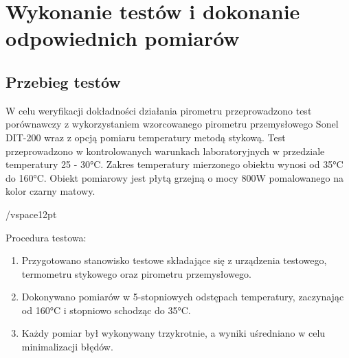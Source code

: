 \chapter{Wykonanie testów i dokonanie odpowiednich pomiarów}
\section{Przebieg testów}

W celu weryfikacji dokładności działania pirometru przeprowadzono test porównawczy z wykorzystaniem wzorcowanego pirometru przemysłowego Sonel DIT-200 wraz z opcją pomiaru temperatury metodą stykową.
Test przeprowadzono w kontrolowanych warunkach laboratoryjnych w przedziale temperatury 25 - 30°C.
Zakres temperatury mierzonego obiektu wynosi od 35°C do 160°C. Obiekt pomiarowy jest płytą grzejną o mocy 800W pomalowanego na kolor czarny matowy.

/vspace{12pt}

Procedura testowa:
\begin{enumerate}
\item Przygotowano stanowisko testowe składające się z urządzenia testowego, termometru
stykowego oraz pirometru przemysłowego. \item Dokonywano pomiarów w 5-stopniowych odstępach temperatury, zaczynając
od 160°C i stopniowo schodząc do 35°C.
\item Każdy pomiar był wykonywany trzykrotnie, a wyniki uśredniano w celu minimalizacji
błędów.
\end{enumerate}

\newpage


